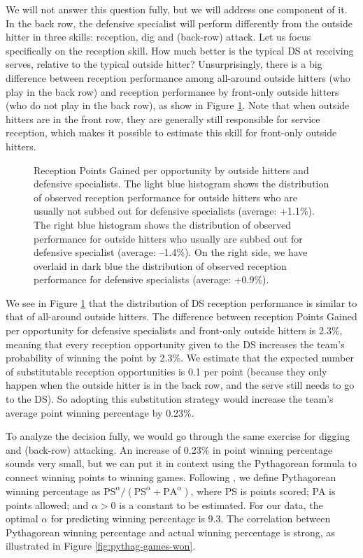 \documentclass[USenglish]{article}
\theoremstyle{dgthm}
\theoremstyle{dgdef}
\begin{document}
We will not answer this question fully, but we will address one component of it. In the back row, the defensive specialist will perform differently from the outside hitter in three skills: reception, dig and (back-row) attack. Let us focus specifically on the reception skill. How much better is the typical DS at receiving serves, relative to the typical outside hitter? Unsurprisingly, there is a big difference between reception performance among all-around outside hitters (who play in the back row) and reception performance by front-only outside hitters (who do not play in the back row), as show in Figure \ref{fig:oh-comparison}. Note that when outside hitters are in the front row, they are generally still responsible for service reception, which makes it possible to estimate this skill for front-only outside hitters.

\begin{figure}
    \centering
    \caption{Reception Points Gained per opportunity by outside hitters and defensive specialists. The light blue histogram shows the distribution of observed reception performance for outside hitters who are usually not subbed out for defensive specialists (average: +1.1\%). The right blue histogram shows the distribution of observed performance for outside hitters who usually are subbed out for defensive specialist (average: --1.4\%). On the right side, we have overlaid in dark blue the distribution of observed reception performance for defensive specialists (average: +0.9\%).}
    \label{fig:oh-comparison}
\end{figure}

We see in Figure \ref{fig:oh-comparison} that the distribution of DS reception performance is similar to that of all-around outside hitters. The difference between reception Points Gained per opportunity for defensive specialists and front-only outside hitters is 2.3\%, meaning that every reception opportunity given to the DS increases the team's probability of winning the point by 2.3\%. We estimate that the expected number of substitutable reception opportunities is 0.1 per point (because they only happen when the outside hitter is in the back row, and the serve still needs to go to the DS). So adopting this substitution strategy would increase the team's average point winning percentage by 0.23\%.

To analyze the decision fully, we would go through the same exercise for digging and (back-row) attacking. An increase of 0.23\% in point winning percentage sounds very small, but we can put it in context using the Pythagorean formula to connect winning points to winning games. Following \textcite{winston_etal_2022}, we define Pythagorean winning percentage as $\mbox{PS}^\alpha / (\mbox{PS}^\alpha + \mbox{PA}^{\alpha})$, where PS is points scored; PA is points allowed; and $\alpha > 0$ is a constant to be estimated. For our data, the optimal $\alpha$ for predicting winning percentage is 9.3. The correlation between Pythagorean winning percentage and actual winning percentage is strong, as illustrated in Figure \ref{fig:pythag-games-won}.
\end{document}
